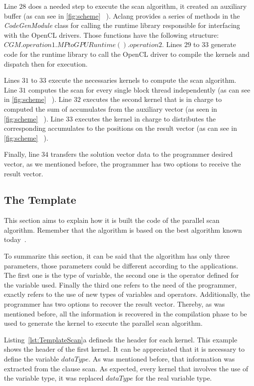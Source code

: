 \documentclass[Ingles]{ic-tese-v1}
\newcommand{\rlst}[1]{Listing~\ref{lst:#1}}
\begin{document}
Line $28$ does a needed step to execute the scan algorithm, it
created an auxiliary buffer (as can see in \ref{fig:scheme} ~).
Aclang provides a series of methods in the {\it CodeGenModule} class for
calling the runtime library responsible for interfacing with the OpenCL
drivers. Those functions have the following structure:
$CGM.operation1.MPtoGPURuntime().operation2$.  Lines $29$ to $33$ generate code
for the runtime library to call the OpenCL driver to compile the kernels and
dispatch then for execution.

Lines $31$ to $33$ execute the necessaries kernels to compute the scan
algorithm. Line $31$ computes the scan for every single block thread
independently (as can see in \ref{fig:scheme} ~). Line $32$ executes
the second kernel that is in charge to computed the sum of accumulates from the
auxiliary vector (as seen in \ref{fig:scheme} ~). Line $33$ executes
the kernel in charge to distributes the corresponding accumulates to the
positions on the result vector (as can see in \ref{fig:scheme} ~).

Finally, line $34$ transfers the solution vector data to the programmer desired
vector, as we mentioned before, the programmer has two options to receive the
result vector.

\subsection{The Template}
\label{sec:template}

This section aims to explain how it is built the code of the parallel scan
algorithm.  Remember that the algorithm is based on the best algorithm known
today~\cite{Sengupta:2007}.

To summarize this section, it can be said that the algorithm has only three
parameters, those parameters could be different according to the applications.
The first one is the  type of variable, the second one is the operator defined
for the variable used. Finally the third one refers to the need of the
programmer, exactly refers to the use of new types of variables and operators.
Additionally, the programmer has two options to recover the result vector.
Thereby, as was mentioned before, all the information is recovered in the
compilation phase to be used to generate the kernel to execute the parallel
scan algorithm.

\rlst{TemplateScan}{a} defineds the header for each kernel. This example shows
the header of the first kernel. It can be appreciated that it is necessary to
define the variable $dataType$. As was mentioned before, that information was
extracted from the clause scan. As expected, every kernel that involves the use
of the variable type, it was replaced $dataType$ for the real variable type.
\end{document}
